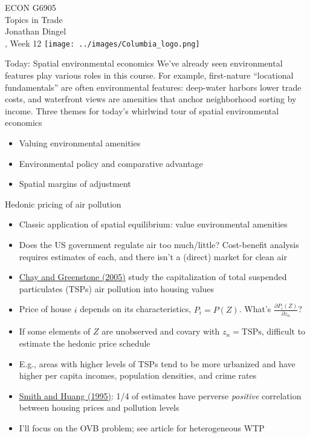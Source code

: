 \documentclass[11pt,notes=hide,aspectratio=169]{beamer}
\begin{document}
\begin{frame}[plain]
\begin{center}
\large
\textcolor{columbiadarkblue}{ECON G6905\\
Topics in Trade\\ 
Jonathan Dingel\\
\semester, Week 12}
\vfill 
\texttt{[image: ../images/Columbia\_logo.png]}
\end{center}
\end{frame}
\begin{frame}{Today: Spatial environmental economics}
We've already seen environmental features play various roles in this course.
For example, 
first-nature ``locational fundamentals'' are often environmental features:
deep-water harbors lower trade costs,
and
waterfront views are amenities that anchor neighborhood sorting by income.
\vspace{1cm}
Three themes for today's whirlwind tour of spatial environmental economics
\begin{itemize}
	\item Valuing environmental amenities
	\item Environmental policy and comparative advantage
	\item Spatial margins of adjustment 
\end{itemize}
\end{frame}
\begin{frame}{Hedonic pricing of air pollution}
\begin{itemize}
\item Classic application of spatial equilibrium: value environmental amenities
\item Does the US government regulate air too much/little? Cost-benefit analysis requires estimates of each, and there isn't a (direct) market for clean air
\item \href{https://doi.org/10.1086/427462}{Chay and Greenstone (2005)} study the capitalization of total suspended particulates (TSPs) air pollution into housing values
\item Price of house $i$ depends on its characteristics, $P_i = P(Z)$. What's $\frac{\partial P_i(Z)}{\partial z_n}$?
\item If some elements of $Z$ are unobserved and covary with $z_n = \text{TSPs}$, difficult to estimate the hedonic price schedule
\item E.g., areas with higher levels of TSPs tend to be more urbanized and have higher per capita incomes, population densities, and crime rates
\item \href{https://doi.org/10.1086/261981}{Smith and Huang (1995)}: 1/4 of estimates have perverse \textit{positive} correlation between housing prices and pollution levels
\item I'll focus on the OVB problem; see article for heterogeneous WTP
\end{itemize}
\end{frame}
\end{document}
